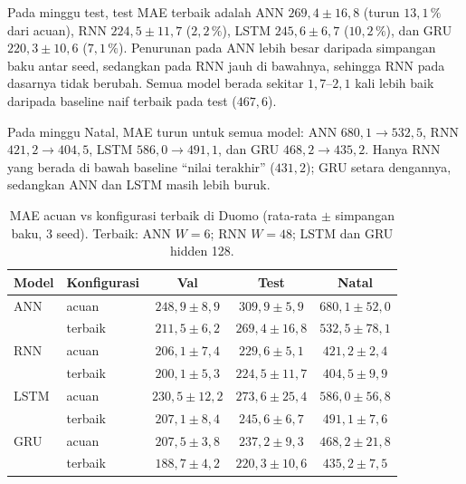 \documentclass[conference,a4paper]{IEEEtran}
\begin{document}
Pada minggu test, test MAE terbaik adalah ANN $269{,}4 \pm 16{,}8$ (turun $13{,}1\,\%$ dari acuan), RNN $224{,}5 \pm 11{,}7$ ($2{,}2\,\%$), LSTM $245{,}6 \pm 6{,}7$ ($10{,}2\,\%$), dan GRU $220{,}3 \pm 10{,}6$ ($7{,}1\,\%$). Penurunan pada ANN lebih besar daripada simpangan baku antar seed, sedangkan pada RNN jauh di bawahnya, sehingga RNN pada dasarnya tidak berubah. Semua model berada sekitar $1{,}7$--$2{,}1$ kali lebih baik daripada baseline naif terbaik pada test ($467{,}6$).

Pada minggu Natal, MAE turun untuk semua model: ANN $680{,}1 \rightarrow 532{,}5$, RNN $421{,}2 \rightarrow 404{,}5$, LSTM $586{,}0 \rightarrow 491{,}1$, dan GRU $468{,}2 \rightarrow 435{,}2$. Hanya RNN yang berada di bawah baseline ``nilai terakhir'' ($431{,}2$); GRU setara dengannya, sedangkan ANN dan LSTM masih lebih buruk.

\begin{table}[t]
  \centering
  \caption{MAE acuan vs konfigurasi terbaik di Duomo (rata-rata $\pm$ simpangan baku, 3 seed). Terbaik: ANN $W=6$; RNN $W=48$; LSTM dan GRU hidden 128.}
  \label{tab:terbaik}
  \footnotesize
  \setlength{\tabcolsep}{3pt}
  \begin{tabular}{@{}llccc@{}}
    \toprule
    Model & Konfigurasi & Val & Test & Natal \\
    \midrule
    ANN  & acuan   & $248{,}9 \pm 8{,}9$  & $309{,}9 \pm 5{,}9$  & $680{,}1 \pm 52{,}0$ \\
         & terbaik & $211{,}5 \pm 6{,}2$  & $269{,}4 \pm 16{,}8$ & $532{,}5 \pm 78{,}1$ \\
    \midrule
    RNN  & acuan   & $206{,}1 \pm 7{,}4$  & $229{,}6 \pm 5{,}1$  & $421{,}2 \pm 2{,}4$ \\
         & terbaik & $200{,}1 \pm 5{,}3$  & $224{,}5 \pm 11{,}7$ & $404{,}5 \pm 9{,}9$ \\
    \midrule
    LSTM & acuan   & $230{,}5 \pm 12{,}2$ & $273{,}6 \pm 25{,}4$ & $586{,}0 \pm 56{,}8$ \\
         & terbaik & $207{,}1 \pm 8{,}4$  & $245{,}6 \pm 6{,}7$  & $491{,}1 \pm 7{,}6$ \\
    \midrule
    GRU  & acuan   & $207{,}5 \pm 3{,}8$  & $237{,}2 \pm 9{,}3$  & $468{,}2 \pm 21{,}8$ \\
         & terbaik & $188{,}7 \pm 4{,}2$  & $220{,}3 \pm 10{,}6$ & $435{,}2 \pm 7{,}5$ \\
    \bottomrule
  \end{tabular}
\end{table}
\end{document}
